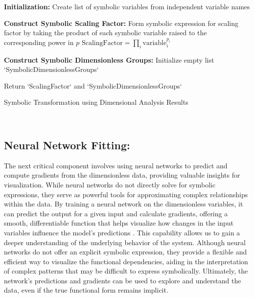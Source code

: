 \documentclass{article}
\begin{document}
\begin{algorithm}[H]
\SetAlgoLined
{}

\textbf{Initialization:}\;
Create list of symbolic variables from independent variable names\;

\textbf{Construct Symbolic Scaling Factor:}\;
Form symbolic expression for scaling factor by taking the product of each symbolic variable raised to the corresponding power in \(p\)\;
\( \text{ScalingFactor} = \prod_{i} \text{variable}_i^{p_i} \)\;

\textbf{Construct Symbolic Dimensionless Groups:}\;
Initialize empty list `SymbolicDimensionlessGroups`\;

Return `ScalingFactor` and `SymbolicDimensionlessGroups`\;

\caption{Symbolic Transformation using Dimensional Analysis Results}
\label{alg:symbolic_transformation} %
\end{algorithm}\\




\subsection{Neural Network Fitting: }


The next critical component involves using neural networks to predict and compute gradients from the dimensionless data, providing valuable insights for visualization. While neural networks do not directly solve for symbolic expressions, they serve as powerful tools for approximating complex relationships within the data. By training a neural network on the dimensionless variables, it can predict the output for a given input and calculate gradients, offering a smooth, differentiable function that helps visualize how changes in the input variables influence the model’s predictions \cite{Alnuqaydan2023}. This capability allows us to gain a deeper understanding of the underlying behavior of the system. Although neural networks do not offer an explicit symbolic expression, they provide a flexible and efficient way to visualize the functional dependencies, aiding in the interpretation of complex patterns that may be difficult to express symbolically. Ultimately, the network's predictions and gradients can be used to explore and understand the data, even if the true functional form remains implicit.\\
\end{document}
